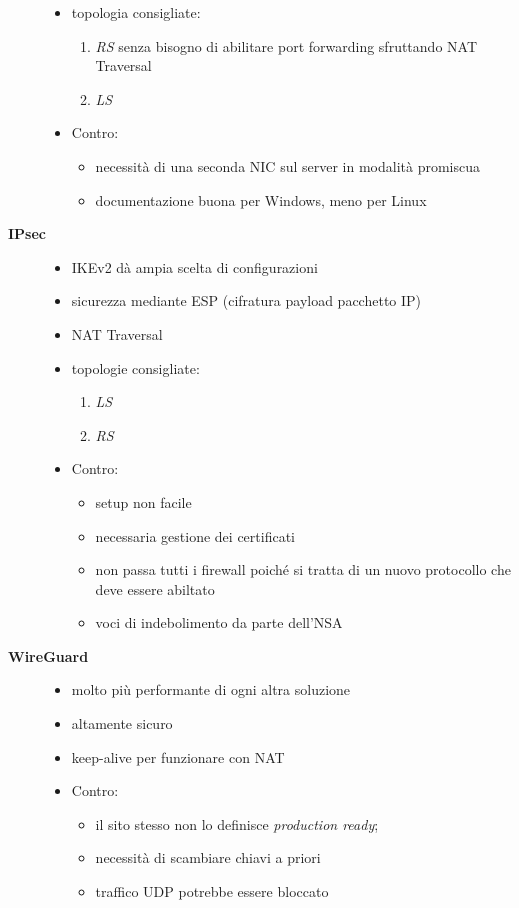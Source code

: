 \begin{description}
\begin{itemize}
      \item topologia consigliate:
      \begin{enumerate}
        \item \textit{RS} senza bisogno di abilitare port forwarding sfruttando
        NAT Traversal
        \item \textit{LS}
      \end{enumerate}
      \item Contro:
      \begin{itemize}
        \item necessità di una seconda NIC sul server in modalità promiscua
        \item documentazione buona per Windows, meno per Linux
      \end{itemize}
    \end{itemize}
    \item[\textbf{IPsec}]
    \begin{itemize}
      \item IKEv2 dà ampia scelta di configurazioni
      \item sicurezza mediante ESP (cifratura payload pacchetto IP)
      \item NAT Traversal
      \item topologie consigliate:
      \begin{enumerate}
        \item \textit{LS}
        \item \textit{RS}
      \end{enumerate}
      \item Contro:
      \begin{itemize}
        \item setup non facile
        \item necessaria gestione dei certificati
        \item non passa tutti i firewall poiché si tratta di un nuovo protocollo
        che deve essere abiltato
        \item voci di indebolimento da parte dell'NSA
      \end{itemize}
    \end{itemize}
    \item[\textbf{WireGuard}]
    \begin{itemize}
      \item molto più performante di ogni altra soluzione
      \item altamente sicuro
      \item keep-alive per funzionare con NAT
      \item Contro:
      \begin{itemize}
        \item il sito stesso non lo definisce \textit{production ready};
        \item necessità di scambiare chiavi a priori
        \item traffico UDP potrebbe essere bloccato
      \end{itemize}
    \end{itemize}
\end{description}
